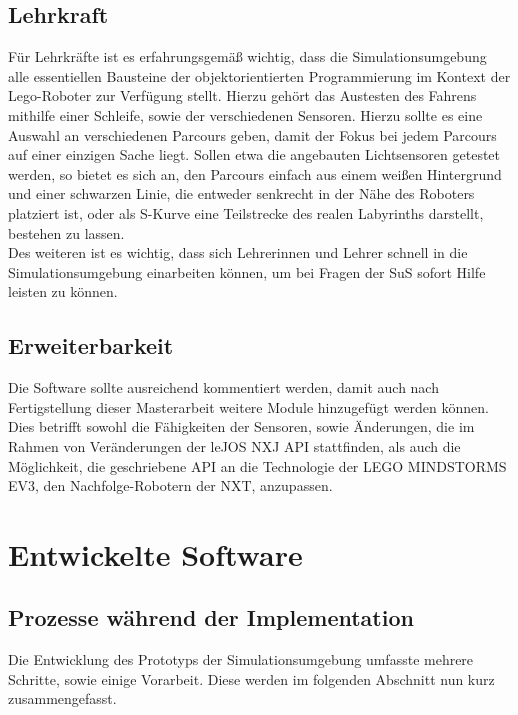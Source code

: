 \documentclass[paper=a4, pagesize, DIV=calc, BCOR=12.5mm, twoside=on, onecolumn=on, open = any, titlepage =on, parskip =half-, headsepline = on, footsepline = on, chapterprefix = on, appendixprefix = off, fontsize = 12pt, numbers = noenddot, abstract = on]{scrbook}
\numberwithin{equation}{chapter}
\theoremstyle{definition}
\theoremstyle{plain}
\theoremstyle{plain}
\theoremstyle{remark}
\theoremstyle{plain}
\theoremstyle{plain}
\begin{document}
\section{Lehrkraft}
\label{sec:lehrkraft}
\par \onehalfspacing
Für Lehrkräfte ist es erfahrungsgemäß wichtig, dass die Simulationsumgebung alle essentiellen Bausteine der objektorientierten Programmierung im Kontext der Lego-Roboter zur Verfügung stellt. Hierzu gehört das Austesten des Fahrens mithilfe einer Schleife, sowie der verschiedenen Sensoren. Hierzu sollte es eine Auswahl an verschiedenen Parcours geben, damit der Fokus bei jedem Parcours auf einer einzigen Sache liegt. Sollen etwa die angebauten Lichtsensoren getestet werden, so bietet es sich an, den Parcours einfach aus einem weißen Hintergrund und einer schwarzen Linie, die entweder senkrecht in der Nähe des Roboters platziert ist, oder als S-Kurve eine Teilstrecke des realen Labyrinths darstellt, bestehen zu lassen.\\
Des weiteren ist es wichtig, dass sich Lehrerinnen und Lehrer schnell in die Simulationsumgebung einarbeiten können, um bei Fragen der SuS sofort Hilfe leisten zu können.

\par \singlespacing
\section{Erweiterbarkeit} \label{sec:erweiterbarkeit}
\onehalfspacing
Die Software sollte ausreichend kommentiert werden, damit auch nach Fertigstellung dieser Masterarbeit weitere Module hinzugefügt werden können. Dies betrifft sowohl die Fähigkeiten der Sensoren, sowie Änderungen, die im Rahmen von Veränderungen der leJOS NXJ API stattfinden, als auch die Möglichkeit, die geschriebene API an die Technologie der LEGO MINDSTORMS EV3, den Nachfolge-Robotern der NXT, anzupassen.
\newpage
\newpage

\par \singlespacing
\chapter{Entwickelte Software}
\onehalfspacing
\par \singlespacing
\section{Prozesse während der Implementation}
\onehalfspacing
Die Entwicklung des Prototyps der Simulationsumgebung umfasste mehrere Schritte, sowie einige Vorarbeit. Diese werden im folgenden Abschnitt nun kurz zusammengefasst.
\par \singlespacing
\end{document}

